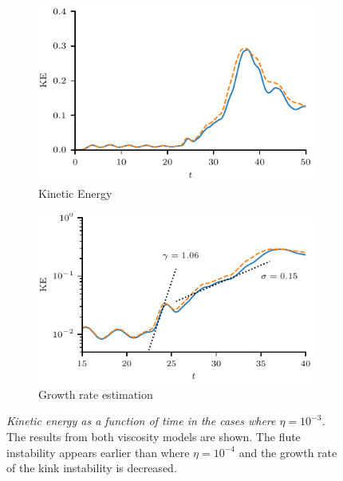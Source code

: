 \documentclass[fleqn,usenatbib]{mnras}
\newcommand{\rs}[2]{{#2}}
\newcommand{\mycaption}[2]{\caption[#1]{\emph{#1} #2}}
\begin{document}
\begin{figure}
  \centering
    \begin{subfigure}{0.49\textwidth}
      \includegraphics[width=\linewidth]{kinetic_energy-3.pdf}
      \caption{Kinetic Energy}
      \label{fig:kink_ke-3}
    \end{subfigure}
    \hfill
    \begin{subfigure}{0.49\textwidth}
      \includegraphics[width=\linewidth]{kinetic_energy_log-3.pdf}
      \caption{Growth rate estimation}
      \label{fig:kink_ke_log-3}
    \end{subfigure}
\mycaption{Kinetic energy as a function of time in the cases where $\eta=10^{-3}$.}{The results from both viscosity models are shown. The \rs{fluting}{flute} instability appears earlier than where $\eta=10^{-4}$ and the growth rate of the kink instability is decreased.}
\label{fig:kink_str8_ke-3}%
\end{figure}
\end{document}
